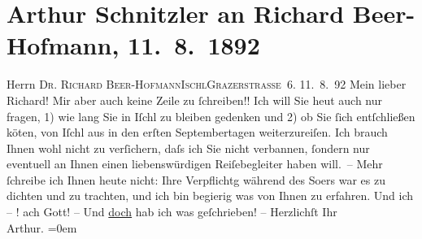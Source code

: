

               \section[Arthur Schnitzler an Richard Beer-Hofmann, 11. 8. 1892]{ Arthur Schnitzler an Richard Beer-Hofmann, 11. 8. 1892}\nopagebreak{}\rehead{ }\begin{ledgroupsized}[t]{13cm}\normalsize\beginnumbering{} \toendnotes[C]{\smallbreak\pagebreak[2]} 
\pstart{}{\pb}Herrn \textsc{Dr. Richard
                     Beer-Hofmann}\pend{}\pstart{}\textsc{Ischl}\pend{}\pstart{}\textsc{Grazerstraße 6}.\pend{}{\bigskip}\pstart
           \raggedleft{}{\pb}11. 8. 92\pend
           \pstart
           Mein lieber Richard! Mir aber auch keine Zeile zu ſchreiben!! Ich
               will Sie heut auch nur fragen, 1) wie lang Sie in Iſchl zu bleiben gedenken und 2) ob Sie ſich entſchließen kö{\geminationn}ten, von Iſchl aus in
               den erſten Septembertagen weiterzureiſen. Ich brauch Ihnen wohl nicht zu verſichern,
               daſs ich Sie nicht verbannen, ſondern nur eventuell \introOben{}an Ihnen\introOben{}
               einen liebenswürdigen Reiſebegleiter haben will. –\pend
           \pstart
           Mehr ſchreibe ich Ihnen heute nicht: Ihre Verpflichtg während des So{\geminationm}ers war es zu dichten und zu trachten, und ich bin
               begierig was von Ihnen zu erfahren. Und ich – ! ach Gott! – Und \uline{doch} hab ich was geſchrieben! –\pend
           \pstart
           Herzlichſt Ihr{\\[\baselineskip]}\spacefill\mbox{Arthur.}\pend
           \leftskip=0em{}\endnumbering{}\end{ledgroupsized}  \newcommand{\dateiname}{L00113}\newcommand{\titel}{Arthur Schnitzler an Richard Beer-Hofmann, 11. 8. 1892}\newcommand{\editorInnen}{Martin Anton Müller und Gerd-Hermann Susen}
      